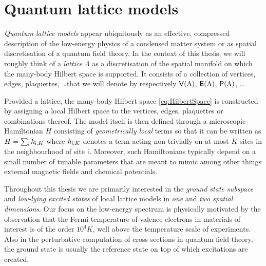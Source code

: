 \section{Quantum lattice models}
\emph{Quantum lattice models} appear ubiquitously as an effective, compressed description of the low-energy physics of a condensed matter system or as spatial discretisation of a quantum field theory. In the context of this thesis, we will roughly think of a \emph{lattice} $\Lambda$ as a discretisation of the spatial manifold on which the many-body Hilbert space is supported. It consists of a collection of vertices, edges, plaquettes, \dots that we will denote by respectively $\mathsf{V}(\Lambda)$, $\mathsf{E}(\Lambda)$, $\mathsf{P}(\Lambda)$, \dots

Provided a lattice, the many-body Hilbert space \cref{eq:HilbertSpace} is constructed by assigning a local Hilbert space to the vertices, edges, plaquettes or combinations thereof. The model itself is then defined through a microscopic Hamiltonian $H$ consisting of \emph{geometrically local} terms so that it can be written as $H=\sum_{\mathsf{i}} h_{\mathsf{i},K}$ where $h_{\mathsf{i}, K}$ denotes a term acting non-trivially on at most $K$ sites in the neighbourhood of site $\mathsf{i}$. Moreover, such Hamiltonians typically depend on a small number of tunable parameters that are meant to mimic among other things external magnetic fields and chemical potentials.

Throughout this thesis we are primarily interested in the \emph{ground state subspace} and \emph{low-lying excited states} of local lattice models in \emph{one} and \emph{two spatial dimensions}. Our focus on the low-energy spectrum is physically motivated by the observation that the Fermi temperature of valence electrons in materials of interest is of the order $10^4K$, well above the temperature scale of experiments. Also in the perturbative computation of cross sections in quantum field theory, the ground state is usually the reference state on top of which excitations are created.

